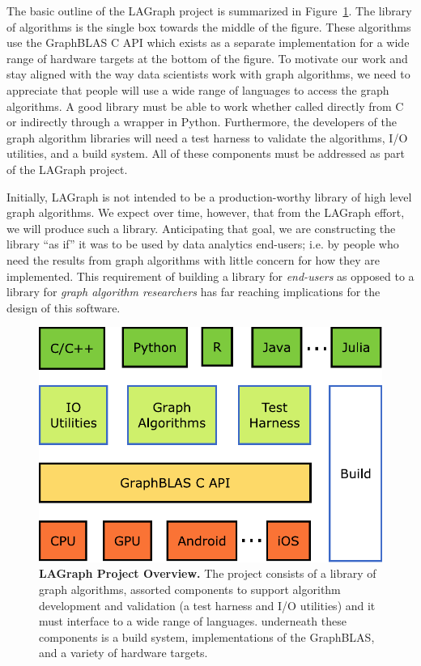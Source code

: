 The basic outline of the LAGraph project  is summarized in 
Figure~\ref{fig:overview}. The library of algorithms is the single box towards
the middle of the figure.  These algorithms use the GraphBLAS C API
which exists as a separate implementation for a wide range of hardware
targets at the bottom of the figure.  To motivate our work and stay aligned 
with the way data scientists work with graph algorithms, we need to appreciate that
people will use a wide range of languages to access the graph algorithms.  A good library
must be able to work whether called directly from C or indirectly through a wrapper in Python.
Furthermore, the developers of the graph algorithm libraries will need a test harness to
validate the algorithms, I/O utilities, and a build system.  All of these components must
be addressed as part of the LAGraph project. 

Initially, LAGraph is not intended to be a production-worthy library of 
high level graph algorithms.  We expect over time, however, that from the LAGraph 
effort, we will produce such a library.  Anticipating that goal, we are constructing
the library ``as if'' it was to be used by data analytics end-users; i.e. by people
who need the results from graph algorithms with little concern for how they are
implemented.  This requirement of building a library for \emph{end-users} as opposed to 
a library for \emph{graph algorithm researchers} has far reaching implications for the 
design of this software.

\begin{figure}[t]
	\includegraphics[width=\linewidth]{fig/lagraph}
	\caption{\textbf{LAGraph Project Overview.} The project consists of a library of 
	graph algorithms, assorted components to support algorithm development and validation
	(a test harness and I/O utilities) and it must interface to a wide range of languages.
	underneath these components is a build system, implementations of the GraphBLAS, 
	and a variety of hardware targets. \label{fig:overview}}
\end{figure}

